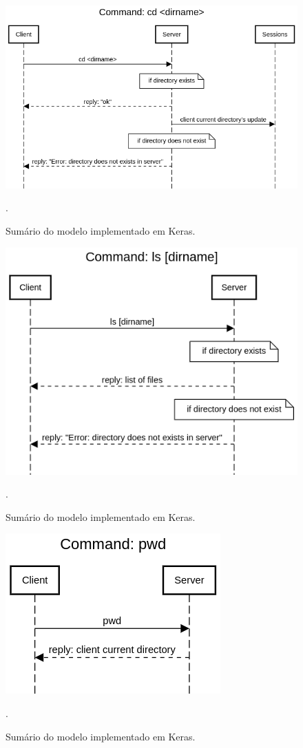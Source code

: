 \documentclass[conference]{IEEEtran}
\begin{document}
\begin{figure}[htbp]
\centering
\centerline{\includegraphics[scale=0.3]{diagrams/Command_cd_dirname.png}}
\caption{Sumário do modelo implementado em Keras.}.
\label{summary}
\end{figure}

\begin{figure}[htbp]
\centering
\centerline{\includegraphics[scale=0.4]{diagrams/Command_ls_dirname.png}}
\caption{Sumário do modelo implementado em Keras.}.
\label{summary}
\end{figure}

\begin{figure}[htbp]
\centering
\centerline{\includegraphics[scale=0.4]{diagrams/Command_pwd.png}}
\caption{Sumário do modelo implementado em Keras.}.
\label{summary}
\end{figure}
\end{document}

